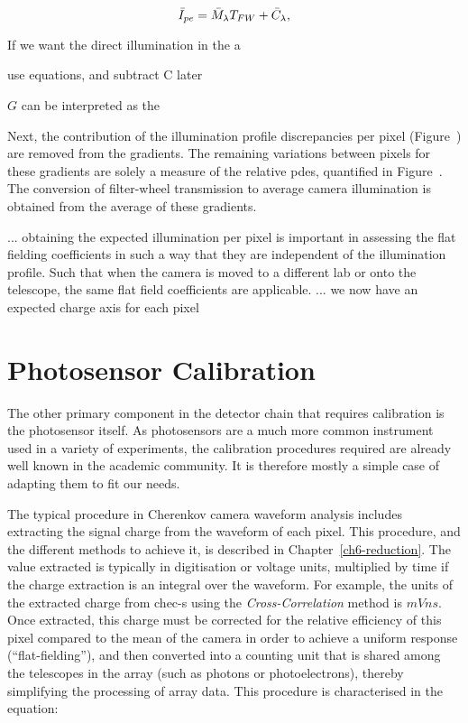 \begin{equation} \label{eq:average_camera_illumination}
\bar{I}_{pe} = \bar{M}_\lambda T_{FW} + \bar{C}_\lambda,
\end{equation}

If we want the direct illumination in the a

use equations, and subtract C later

$G$ can be interpreted as the 

Next, the contribution of the illumination profile discrepancies per pixel (Figure~) are removed from the gradients. The remaining variations between pixels for these gradients are solely a measure of the relative \glspl{pde}, quantified in Figure~. The conversion of filter-wheel transmission to average camera illumination is obtained from the average of these gradients.

... obtaining the expected illumination per pixel is important in assessing the flat fielding coefficients in such a way that they are independent of the illumination profile. Such that when the camera is moved to a different lab or onto the telescope, the same flat field coefficients are applicable.
... we now have an expected charge axis for each pixel

\section{Photosensor Calibration} \label{Photosensor Calibration}


The other primary component in the detector chain that requires calibration is the photosensor itself. As photosensors are a much more common instrument used in a variety of experiments, the calibration procedures required are already well known in the academic community. It is therefore mostly a simple case of adapting them to fit our needs.

The typical procedure in Cherenkov camera waveform analysis includes extracting the signal charge from the waveform of each pixel. This procedure, and the different methods to achieve it, is described in Chapter~\ref{ch6-reduction}. The value extracted is typically in digitisation or voltage units, multiplied by time if the charge extraction is an integral over the waveform. For example, the units of the extracted charge from \gls{chec-s} using the \textit{Cross-Correlation} method is $mV ns$. Once extracted, this charge must be corrected for the relative efficiency of this pixel compared to the mean of the camera in order to achieve a uniform response (``flat-fielding''), and then converted into a counting unit that is shared among the telescopes in the array (such as photons or photoelectrons), thereby simplifying the processing of array data. This procedure is characterised in the equation: 

